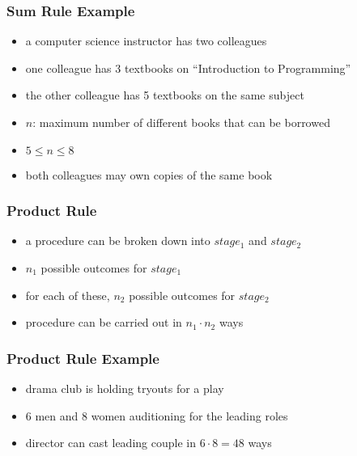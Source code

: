 \documentclass[dvipsnames]{beamer}
\begin{document}
\begin{frame}
  \frametitle{Sum Rule Example}

  \begin{itemize}
    \item a computer science instructor has two colleagues
    \item one colleague has 3 textbooks on ``Introduction to Programming''
    \item the other colleague has 5 textbooks on the same subject

    \medskip
    \item $n$: maximum number of different books that can be borrowed
    \item $5 \leq n \leq 8$
    \item both colleagues may own copies of the same book
  \end{itemize}
\end{frame}

\begin{frame}
  \frametitle{Product Rule}

  \begin{itemize}
    \item a procedure can be broken down into $stage_1$ and $stage_2$
    \item $n_1$ possible outcomes for $stage_1$
    \item for each of these, $n_2$ possible outcomes for $stage_2$

    \medskip
    \item procedure can be carried out in $n_1 \cdot n_2$ ways
  \end{itemize}
\end{frame}

\begin{frame}
  \frametitle{Product Rule Example}

  \begin{itemize}
    \item drama club is holding tryouts for a play
    \item 6 men and 8 women auditioning for the leading roles

    \medskip
    \item director can cast leading couple in $6 \cdot 8 = 48$ ways
  \end{itemize}
\end{frame}
\end{document}
